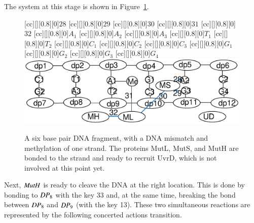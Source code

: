 The system at this stage is shown in Figure~\ref{fig:state15}. 
%
\begin{figure}[h!]
[cc][][0.8][0]{$28$}
[cc][][0.8][0]{$29$}
[cc][][0.8][0]{$30$}
[cc][][0.8][0]{$31$}
[cc][][0.8][0]{$32$}
[cc][][0.8][0]{$A_1$}
[cc][][0.8][0]{$A_2$}
[cc][][0.8][0]{$A_3$}
[cc][][0.8][0]{$T_1$}
[cc][][0.8][0]{$T_2$}
[cc][][0.8][0]{$C_1$}
[cc][][0.8][0]{$C_2$}
[cc][][0.8][0]{$C_3$}
[cc][][0.8][0]{$G_1$}
[cc][][0.8][0]{$G_2$}
[cc][][0.8][0]{$G_3$}
[cc][][0.8][0]{$G_4$}
  \centering
    \includegraphics[width=1.0\textwidth]{mmr/state15}
  \caption[A six base pair DNA fragment.]{A six base pair DNA fragment, with a DNA mismatch and methylation of one strand. The proteins MutL, MutS, and  MutH are bonded to the strand and ready to recruit UvrD, which is not
  involved at this point yet.}
  \label{fig:state15}
\end{figure}

Next, $\mathit{MutH}$ is ready to cleave the DNA at the right location. This is done by bonding to $\mathit{DP}_8$ with the key 33 and, at the same time, breaking the bond between $\mathit{DP}_8$ and $\mathit{DP}_9$ (with the key 13). These two simultaneous reactions are represented by the following concerted actions transition.

